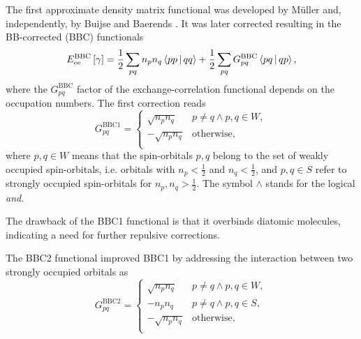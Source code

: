 The first approximate density matrix functional was developed by Müller
and, independently, by Buijse and Baerends .
It was later corrected resulting in the BB-corrected (BBC) functionals
\begin{equation}
    E_{\text{ee}}^{\text{BBC}}\left[ \fordm \right] =
    \frac{1}{2} \sum_{pq} n_p n_q \Braket{pp | qq} +
    \frac{1}{2} \sum_{pq} G_{pq}^{\text{BBC}} \Braket{pq | qp}
    ,
\end{equation}
where the $G_{pq}^{\text{BBC}}$ factor of the exchange-correlation functional
depends on the occupation numbers.
The first correction reads
\begin{equation}
    G_{pq}^{\text{BBC1}} = 
    \begin{cases}
        \sqrt{n_p n_q} & p \not= q \wedge p,q \in W, \\
        -\sqrt{n_p n_q} & \text{otherwise}, \\
    \end{cases}
\end{equation}
where $p,q \in W$ means that the spin-orbitals $p,q$ belong to the set of weakly
occupied spin-orbitals, i.e. 
orbitals with $n_p < \frac{1}{2}$ and $n_q < \frac{1}{2}$, and
$p,q \in S$ refer to strongly occupied spin-orbitals for
$n_p, n_q > \frac{1}{2}$.
The symbol $\wedge$ stands for the logical \textit{and}.

The drawback of the BBC1 functional is that it overbinds diatomic molecules,
indicating a need for further repulsive corrections.

The BBC2 functional improved BBC1 by addressing the interaction between two
strongly occupied orbitals as
\begin{equation}
    G_{pq}^{\text{BBC2}} = 
    \begin{cases}
        \sqrt{n_p n_q} & p \not= q \wedge p,q \in W, \\
        -n_p n_q & p \not= q \wedge p,q \in S, \\
        -\sqrt{n_p n_q} & \text{otherwise}, \\
    \end{cases}
\end{equation}

